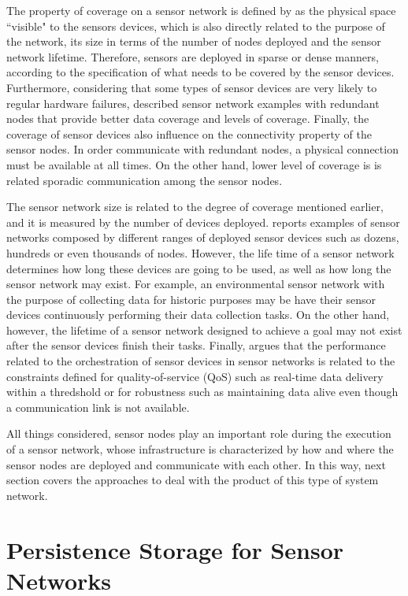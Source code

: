 The property of coverage on a sensor network is defined by
\cite{sn-intro01} as the physical space ``visible" to the sensors devices, which
is also directly related to the purpose of the network, its size in terms of
the number of nodes deployed and the sensor network lifetime. Therefore,
sensors are deployed in sparse or dense manners, according to the
specification of what needs to be covered by the sensor devices. Furthermore,
considering that some types of sensor devices are very likely to regular
hardware failures, \cite{sn-intro02} described sensor network examples with 
redundant nodes that provide better data coverage and levels of coverage.
Finally, the coverage of sensor devices also influence on the connectivity
property of the sensor nodes. In order communicate with redundant nodes, a
physical connection must be available at all times. On the other hand, lower
level of coverage is is related sporadic communication among the sensor nodes.

The sensor network size is related to the degree of coverage mentioned earlier,
and it is measured by the number of devices deployed. \cite{sn-intro01}
reports examples of sensor networks composed by different ranges of deployed
sensor devices such as dozens, hundreds or even thousands of nodes. However,
the life time of a sensor network determines how long these devices are going
to be used, as well as how long the sensor network may exist. For example, an
environmental sensor network \cite{sn-ex01} with the purpose of collecting data
for historic purposes may be have their sensor devices continuously performing
their data collection tasks. On the other hand, however, the lifetime of a
sensor network designed to achieve a goal may not exist after the sensor
devices finish their tasks. Finally, \cite{sn-intro02} argues that the
performance related to the orchestration of sensor devices in sensor networks
is related to the constraints defined for quality-of-service (QoS) such as
real-time data delivery within a thredshold or for robustness such as
maintaining data alive even though a communication link is not available.

All things considered, sensor nodes play an important role during the execution
of a sensor network, whose infrastructure is characterized by how and where the
sensor nodes are deployed and communicate with each other. In this way, next
section covers the approaches to deal with the product of this type of system
network.

\section{Persistence Storage for Sensor Networks}

